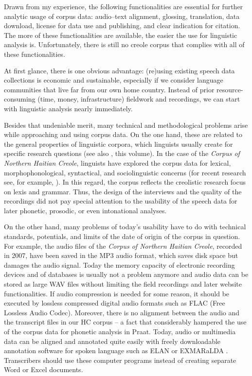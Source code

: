 \documentclass[output=paper]{langsci/langscibook}
\begin{document}
Drawn from my experience, the following functionalities are essential for further analytic usage of corpus data: audio–text alignment, glossing, translation, data download, license for data use and publishing, and clear indication for citation. The more of these functionalities are available, the easier the use for linguistic analysis is. Unfortunately, there is still no creole corpus that complies with all of these functionalities.

At first glance, there is one obvious advantage: (re)using existing speech data collections is economic and sustainable, especially if we consider language communities that live far from our own home country. Instead of prior resource-consuming (time, money, infrastructure) fieldwork and recordings, we can start with linguistic analysis nearly immediately.

Besides that undeniable merit, many technical and methodological problems arise while approaching and using corpus data. On the one hand, these are related to the general properties of linguistic corpora, which linguists usually create for specific research questions (see also \citeauthor{GarridoAlminana.2018}, this volume). In the case of the \textit{Corpus of Northern Haitian Creole}, linguists have explored the corpus data for lexical, morphophonological, syntactical, and sociolinguistic concerns (for recent research see, for example, \citealt{Valdman2015}). In this regard, the corpus reflects the creolistic research focus on lexis and grammar. Thus, the design of the interviews and the quality of the recordings did not pay special attention to the usability of the speech data for later phonetic, prosodic, or even intonational analyses. 

On the other hand, many problems of today’s usability have to do with technical standards, potentials, and limits of the date of origin of the corpus in question. For example, the audio files of the \textit{Corpus of Northern Haitian Creole}, recorded in 2007, have been saved in the MP3 audio format, which saves disk space but damages the audio signal. Today the memory capacity of electronic recording devices and of databases is usually not a problem anymore and audio data can be stored as large WAV files without limiting the field recordings and later website functionalities. If audio compression is needed for some reason, it should be executed by lossless compressed digital audio formats such as FLAC ({{F}}ree {{L}}ossless {{A}}udio {{C}}odec). Moreover, there is no alignment between the audio and the transcript files in our HC corpus – a fact that considerably hampered the use of the corpus data for phonetic analysis in Praat. Today, audio or multimedia data can be aligned and annotated quite easily with freely downloadable annotation software for spoken language such as ELAN \citep{Wittenburg2006} or EXMARaLDA \citep{Schmidt.2009}. Transcribers should use these computer programs instead of creating separate Word or Excel documents.
\end{document}
